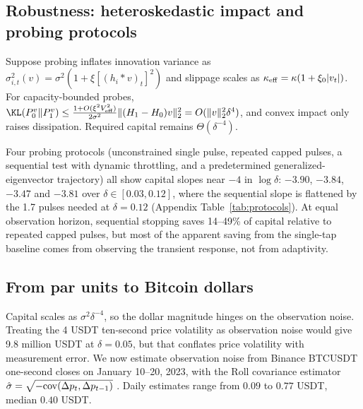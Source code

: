 \subsection{Robustness: heteroskedastic impact and probing protocols}

\begin{corollary}\label{cor:garch}
Suppose probing inflates innovation variance as $\sigma^2_{i,t}(v)=\sigma^2(1+\xi[(h_i*v)_t]^2)$ and slippage scales as $\kappa_{\rm eff}=\kappa(1+\xi_0|v_t|)$. For capacity-bounded probes, $\KL(P_0^v\|P_1^v)\le\frac{1+O(\xi^2V_{\rm eff}^2)}{2\sigma^2}\|(H_1-H_0)v\|_2^2=O(\|v\|_2^2\delta^4)$, and convex impact only raises dissipation. Required capital remains $\Theta(\delta^{-4})$.
\end{corollary}

Four probing protocols (unconstrained single pulse, repeated capped pulses, a sequential test with dynamic throttling, and a predetermined generalized-eigenvector trajectory) all show capital slopes near $-4$ in $\log\delta$: $-3.90$, $-3.84$, $-3.47$ and $-3.81$ over $\delta\in[0.03,0.12]$, where the sequential slope is flattened by the 1.7 pulses needed at $\delta=0.12$ (Appendix Table~\ref{tab:protocols}). At equal observation horizon, sequential stopping saves 14--49\% of capital relative to repeated capped pulses, but most of the apparent saving from the single-tap baseline comes from observing the transient response, not from adaptivity.

\subsection{From par units to Bitcoin dollars}\label{sec:dollars}

Capital scales as $\sigma^2\delta^{-4}$, so the dollar magnitude hinges on the observation noise. Treating the 4 USDT ten-second price volatility as observation noise would give 9.8 million USDT at $\delta=0.05$, but that conflates price volatility with measurement error. We now estimate observation noise from Binance BTCUSDT one-second closes on January 10--20, 2023, with the Roll covariance estimator $\hat\sigma=\sqrt{-{\rm cov}(\Delta p_t,\Delta p_{t-1})}$ \citep{roll1984}. Daily estimates range from $0.09$ to $0.77$ USDT, median $0.40$ USDT.

